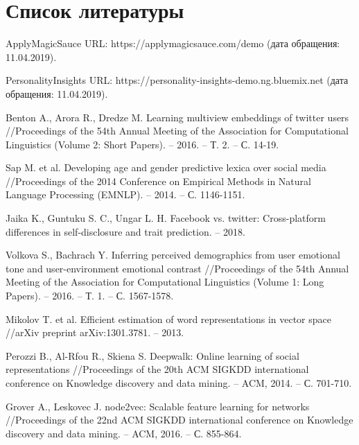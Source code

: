 \section{Список литературы}

\begingroup
\let\clearpage\relax
\vskip-3cm
\begin{thebibliography}{9}

ApplyMagicSauce URL: https://applymagicsauce.com/demo (дата обращения: 11.04.2019).

PersonalityInsights URL: https://personality-insights-demo.ng.bluemix.net (дата обращения: 11.04.2019).

Benton A., Arora R., Dredze M. Learning multiview embeddings of twitter users //Proceedings of the 54th Annual Meeting of the Association for Computational Linguistics (Volume 2: Short Papers). – 2016. – Т. 2. – С. 14-19.

Sap M. et al. Developing age and gender predictive lexica over social media //Proceedings of the 2014 Conference on Empirical Methods in Natural Language Processing (EMNLP). – 2014. – С. 1146-1151.

Jaika K., Guntuku S. C., Ungar L. H. Facebook vs. twitter: Cross-platform differences in self-disclosure and trait prediction. – 2018.

Volkova S., Bachrach Y. Inferring perceived demographics from user emotional tone and user-environment emotional contrast //Proceedings of the 54th Annual Meeting of the Association for Computational Linguistics (Volume 1: Long Papers). – 2016. – Т. 1. – С. 1567-1578.

Mikolov T. et al. Efficient estimation of word representations in vector space //arXiv preprint arXiv:1301.3781. – 2013.

Perozzi B., Al-Rfou R., Skiena S. Deepwalk: Online learning of social representations //Proceedings of the 20th ACM SIGKDD international conference on Knowledge discovery and data mining. – ACM, 2014. – С. 701-710.

Grover A., Leskovec J. node2vec: Scalable feature learning for networks //Proceedings of the 22nd ACM SIGKDD international conference on Knowledge discovery and data mining. – ACM, 2016. – С. 855-864.


\end{thebibliography}
